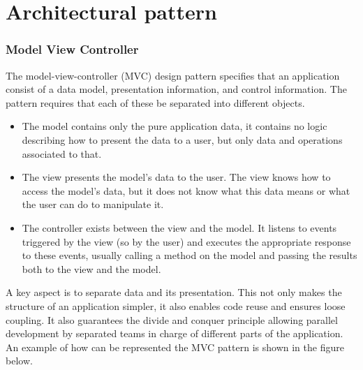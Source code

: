 \section{Architectural pattern}
\subsubsection{Model View Controller}
The model-view-controller (MVC) design pattern specifies that an application consist of a data model, presentation information, and control information. The pattern requires that each of these be separated into different objects.
\begin{itemize}

\item	The model contains only the pure application data, it contains no logic describing how to present the data to a user, but only data and operations associated to that.
\item	The view presents the model's data to the user. The view knows how to access the model's data, but it does not know what this data means or what the user can do to manipulate it.
\item	The controller exists between the view and the model. It listens to events triggered by the view (so by the user) and executes the appropriate response to these events, usually calling a method on the model and passing the results both to the view and the model.
\end{itemize}
A key aspect is to separate data and its presentation. This not only makes the structure of an application simpler, it also enables code reuse and ensures loose coupling.
It also guarantees the divide and conquer principle allowing parallel development by separated teams in charge of different parts of the application.
\\
An example of how can be represented the MVC pattern is shown in the figure below.

\begin{center}
\end{center}

